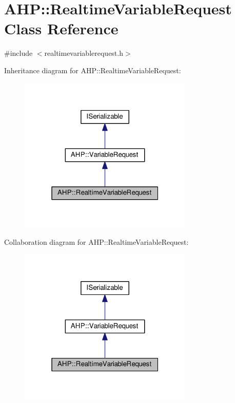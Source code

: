 \hypertarget{class_a_h_p_1_1_realtime_variable_request}{}\section{A\+H\+P\+:\+:Realtime\+Variable\+Request Class Reference}
\label{class_a_h_p_1_1_realtime_variable_request}


{\ttfamily \#include $<$realtimevariablerequest.\+h$>$}



Inheritance diagram for A\+H\+P\+:\+:Realtime\+Variable\+Request\+:
\nopagebreak
\begin{figure}[H]
\begin{center}
\leavevmode
\includegraphics[width=235pt]{class_a_h_p_1_1_realtime_variable_request__inherit__graph}
\end{center}
\end{figure}


Collaboration diagram for A\+H\+P\+:\+:Realtime\+Variable\+Request\+:
\nopagebreak
\begin{figure}[H]
\begin{center}
\leavevmode
\includegraphics[width=235pt]{class_a_h_p_1_1_realtime_variable_request__coll__graph}
\end{center}
\end{figure}

